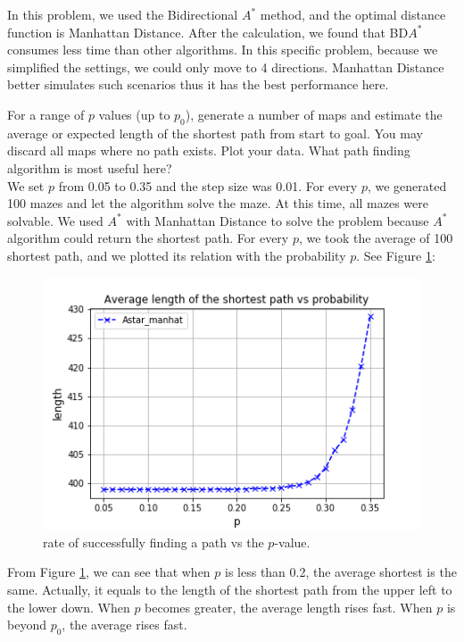 \documentclass[letter]{article}
\begin{document}
\begin{questions}
	In this problem, we used the Bidirectional $ A^* $ method, and the optimal distance function is Manhattan Distance. After the calculation, we found that BD$ A^* $ consumes less time than other algorithms. In this specific problem, because we simplified the settings, we could only move to 4 directions. Manhattan Distance better simulates such scenarios thus it has the best performance here. \\
	
	
	\item {For a range of $ p $ values (up to $ p_0 $), generate a number of maps and estimate the average or expected length of the shortest path from start to goal. You may discard all maps where no path exists. Plot your data. What path finding algorithm is most useful here?} \\
	
	We set $ p $ from 0.05 to 0.35 and the step size was 0.01. For every $ p $, we generated 100 mazes and let the algorithm solve the maze. At this time, all mazes were solvable. We used $ A^* $ with Manhattan Distance to solve the problem because $ A^* $ algorithm could return the shortest path. For every $ p $, we took the average of 100 shortest path, and we plotted its relation with the probability $ p $. See Figure \ref{fig:4}: \\
		
	\begin{figure}
		\centering
		\includegraphics[width=\textwidth]{../pics/question4.png}
		\caption{\label{fig:4}rate of successfully finding a path vs the $ p $-value.}
	\end{figure}

	From Figure \ref{fig:4}, we can see that when $ p $ is less than 0.2, the average shortest is the same. Actually, it equals to the length of the shortest path from the upper left to the lower down. When $ p $ becomes greater, the average length rises fast. When $ p $ is beyond $ p_0 $, the average rises fast. \\
	

\end{questions}
\end{document}
